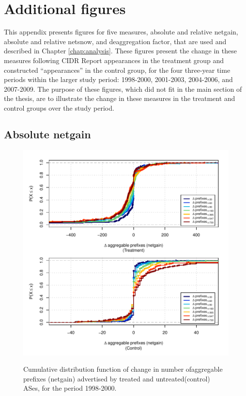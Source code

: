 \chapter{Additional figures}
\label{chap:additional_figs}

This appendix presents figures for five measures, absolute and relative
netgain, absolute and relative netsnow, and deaggregation factor, that are used
and described in Chapter \ref{chap:analysis}. These figures present the change
in these measures following CIDR Report appearances in the treatment group and
constructed ``appearances'' in the control group, for the four three-year time
periods within the larger study period: 1998-2000, 2001-2003, 2004-2006, and
2007-2009. The purpose of these figures, which did not fit in the main section
of the thesis, are to illustrate the change in these measures in the treatment
and control groups over the study period.

\clearpage
\section{Absolute netgain}

\begin{figure}[H]
\begin{centering}
\begin{singlespace}
\captionsetup{list=no}
    \includegraphics[width=6in]{figures/behavior-netgain-1998_2000-corr.pdf}
    \vspace{-2em}\\
    \caption{Cumulative distribution function of change in number ofaggregable
    prefixes (netgain) advertised by treated and untreated(control) ASes, for
    the period 1998-2000.}
\end{singlespace}
\end{centering}
\end{figure}

